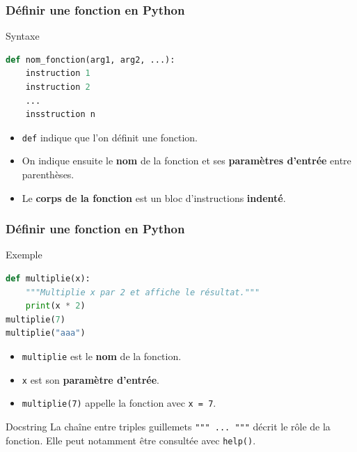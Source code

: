 \documentclass[10pt]{beamer}
\begin{document}
\begin{frame}[containsverbatim]
	\frametitle{Définir une fonction en Python}
	
	\begin{alertblock}{Syntaxe}
\begin{lstlisting}[language=Python]
def nom_fonction(arg1, arg2, ...):
	instruction 1
	instruction 2
	...
	insstruction n
\end{lstlisting}
	\end{alertblock}
	
	\vspace{0.1cm}
	
	\begin{itemize}
		\item \texttt{def} indique que l'on définit une fonction.
		
		\item On indique ensuite le \textbf{nom} de la fonction et ses
		\textbf{paramètres d'entrée} entre parenthèses.
		
		\item Le \textbf{corps de la fonction} est un bloc d'instructions
		\textbf{indenté}.
	\end{itemize}
	
	\vspace{0.1cm}
	

	
\end{frame}
\begin{frame}[containsverbatim]
	\frametitle{Définir une fonction en Python}
	
	\begin{exampleblock}{Exemple}
\begin{lstlisting}[language=Python]
def multiplie(x):
	"""Multiplie x par 2 et affiche le résultat."""
	print(x * 2)
multiplie(7)
multiplie("aaa")
\end{lstlisting}
	\end{exampleblock}
	
	\vspace{0.1cm}
	
	\begin{itemize}
		\item \texttt{multiplie} est le \textbf{nom} de la fonction.
		\item \texttt{x} est son \textbf{paramètre d'entrée}.
		\item \texttt{multiplie(7)} appelle la fonction avec \texttt{x = 7}.
	\end{itemize}
	
	\vspace{0.05cm}
	
	\begin{alertblock}{Docstring}
		La chaîne entre triples guillemets \texttt{""" ... """} décrit
		le rôle de la fonction. Elle peut notamment être consultée avec
		\texttt{help()}.
	\end{alertblock}
	
\end{frame}
\end{document}

